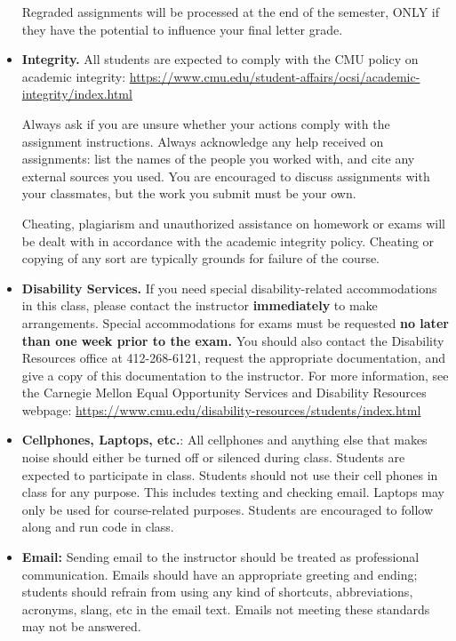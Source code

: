\documentclass[11pt]{article}
\begin{document}
\begin{itemize}
Regraded assignments will be processed at the end of the semester, ONLY if they have the potential to influence your final letter grade.


\item {\bf Integrity.} 
All students are expected to comply with the CMU policy on academic integrity: \url{https://www.cmu.edu/student-affairs/ocsi/academic-integrity/index.html}

Always ask if you are unsure whether your actions comply with the assignment instructions. Always acknowledge any help received on assignments: list the names of the people you worked with, and cite any external sources you used. You are encouraged to discuss assignments with your classmates, but the work you submit must be your own.

Cheating, plagiarism and unauthorized assistance on homework or exams will be dealt with in accordance with the academic integrity policy. Cheating or copying of any sort are typically grounds for failure of the course.

\item {\bf Disability Services.}  If you need special disability-related accommodations in this class, please contact the instructor {\bf immediately} to make arrangements.  Special accommodations for exams must be requested {\bf no later than one week prior to the exam.}  You should also contact the Disability Resources office at 412-268-6121, request the appropriate documentation, and give a copy of this documentation to the instructor.  For more information, see the Carnegie Mellon Equal Opportunity Services and Disability Resources webpage:  \url{https://www.cmu.edu/disability-resources/students/index.html}

\item {\bf Cellphones, Laptops, etc.}:  All cellphones and anything else that makes noise should either be turned off or silenced during class.  Students are expected to participate in class.  Students should not use their cell phones in class for any purpose.  This includes texting and checking email.  Laptops may only be used for course-related purposes.  Students are encouraged to follow along and run code in class.

\item {\bf Email:}  Sending email to the instructor should be treated as professional communication.  Emails should have an appropriate greeting and ending; students should refrain from using any kind of shortcuts, abbreviations, acronyms, slang, etc in the email text.  Emails not meeting these standards may not be answered.


\end{itemize}
\end{document}
